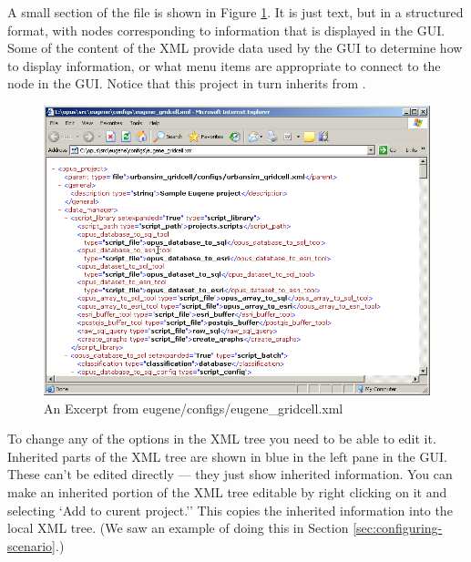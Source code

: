 A small section of the  file is
shown in Figure \ref{fig:opus-xml}.  It is just text, but in a structured
format, with nodes corresponding to information that is displayed in the
GUI.  Some of the content of the XML provide data used by the GUI to
determine how to display information, or what menu items are appropriate to
connect to the node in the GUI.  Notice that this project in turn inherits
from .

\begin{figure}[htp]
\begin{center}
\includegraphics[scale=0.4]{graphics/opus-xml.png}
\end{center}
\caption{An Excerpt from eugene/configs/eugene\_gridcell.xml}
\label{fig:opus-xml}
\end{figure}

To change any of the options in the XML tree you need to be able to edit
it.  Inherited parts of the XML tree are shown in blue in the left pane in
the GUI\@.  These can't be edited directly --- they just show inherited
information.  You can make an inherited portion of the XML tree editable by
right clicking on it and selecting `Add to curent project.''  This copies
the inherited information into the local XML tree.  (We saw an example of
doing this in Section \ref{sec:configuring-scenario}.)


